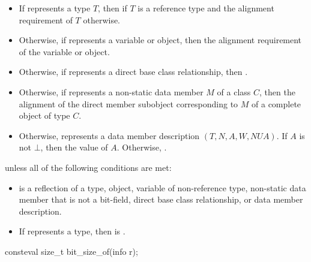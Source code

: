 \begin{itemdescr}
\pnum
\returns
\begin{itemize}
\item
  If  represents a type $T$,
  then  if $T$ is a reference type
  and the alignment requirement of $T$ otherwise.
\item
  Otherwise, if  represents a variable or object,
  then the alignment requirement of the variable or object.
\item
  Otherwise, if  represents a direct base class relationship,
  then .
\item
  Otherwise, if  represents a non-static data member $M$ of a class $C$,
  then the alignment of the direct member subobject
  corresponding to $M$ of a complete object of type $C$.
\item
  Otherwise,  represents a data member description
  $(T, N, A, W, \mathit{NUA})$.
  If $A$ is not $\bot$,
  then the value of $A$.
  Otherwise, .
\end{itemize}

\pnum
\throws
{} unless
all of the following conditions are met:
\begin{itemize}
\item
{} is a reflection of a
type,
object,
variable of non-reference type,
non-static data member that is not a bit-field,
direct base class relationship, or
data member description.
\item
If  represents a type,
then  is .
\end{itemize}
\end{itemdescr}

%
\begin{itemdecl}
consteval size_t bit_size_of(info r);
\end{itemdecl}


